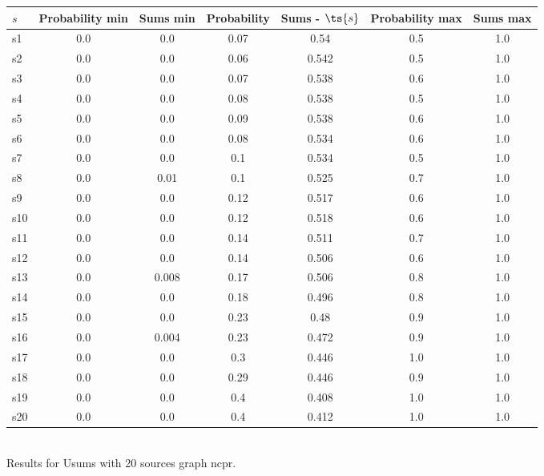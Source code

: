 \documentclass{article}
\begin{document}
\noindent\begin{tabular}{|l|c|c|c|c|c|c|}
\hline
$s$& Probability min & Sums min & Probability & Sums - $\ts{s}$ & Probability max & Sums max\\
\hline
s1 &0.0 & 0.0 & 0.07 & 0.54 & 0.5 & 1.0\\
\hline
s2 &0.0 & 0.0 & 0.06 & 0.542 & 0.5 & 1.0\\
\hline
s3 &0.0 & 0.0 & 0.07 & 0.538 & 0.6 & 1.0\\
\hline
s4 &0.0 & 0.0 & 0.08 & 0.538 & 0.5 & 1.0\\
\hline
s5 &0.0 & 0.0 & 0.09 & 0.538 & 0.6 & 1.0\\
\hline
s6 &0.0 & 0.0 & 0.08 & 0.534 & 0.6 & 1.0\\
\hline
s7 &0.0 & 0.0 & 0.1 & 0.534 & 0.5 & 1.0\\
\hline
s8 &0.0 & 0.01 & 0.1 & 0.525 & 0.7 & 1.0\\
\hline
s9 &0.0 & 0.0 & 0.12 & 0.517 & 0.6 & 1.0\\
\hline
s10 &0.0 & 0.0 & 0.12 & 0.518 & 0.6 & 1.0\\
\hline
s11 &0.0 & 0.0 & 0.14 & 0.511 & 0.7 & 1.0\\
\hline
s12 &0.0 & 0.0 & 0.14 & 0.506 & 0.6 & 1.0\\
\hline
s13 &0.0 & 0.008 & 0.17 & 0.506 & 0.8 & 1.0\\
\hline
s14 &0.0 & 0.0 & 0.18 & 0.496 & 0.8 & 1.0\\
\hline
s15 &0.0 & 0.0 & 0.23 & 0.48 & 0.9 & 1.0\\
\hline
s16 &0.0 & 0.004 & 0.23 & 0.472 & 0.9 & 1.0\\
\hline
s17 &0.0 & 0.0 & 0.3 & 0.446 & 1.0 & 1.0\\
\hline
s18 &0.0 & 0.0 & 0.29 & 0.446 & 0.9 & 1.0\\
\hline
s19 &0.0 & 0.0 & 0.4 & 0.408 & 1.0 & 1.0\\
\hline
s20 &0.0 & 0.0 & 0.4 & 0.412 & 1.0 & 1.0\\
\hline
\end{tabular}\\

\noindent Results for Usums with 20 sources graph ncpr.
\end{document}
